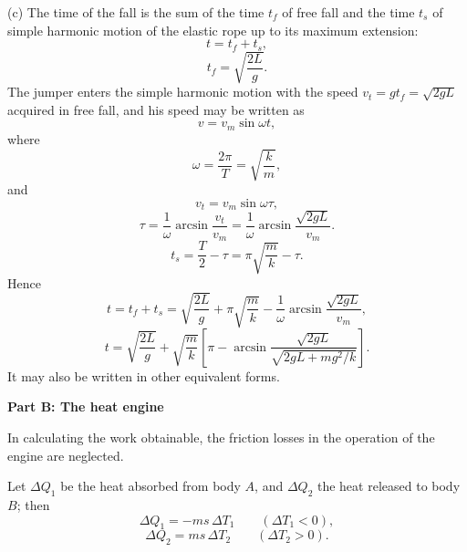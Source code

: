 (c) The time of the fall is the sum of the time $t_f$ of free fall and the time $t_s$ of simple harmonic motion of the elastic rope up to its maximum extension:
\begin{equation*}
t=t_f+t_s ,
\end{equation*}
\begin{equation*}
t_f=\sqrt{\frac{2L}{g}} .
\end{equation*}
The jumper enters the simple harmonic motion with the speed $v_t=gt_f=\sqrt{2gL}$ acquired in free fall, and his speed may be written as
\begin{equation*}
v=v_m\sin\omega t ,
\end{equation*}
where
\begin{equation*}
\omega=\frac{2\pi}{T}=\sqrt{\frac{k}{m}} ,
\end{equation*}
and
\begin{equation*}
v_t=v_m\sin\omega\tau ,
\end{equation*}
\begin{equation*}
\tau=\frac{1}{\omega}\arcsin\frac{v_t}{v_m}
=\frac{1}{\omega}\arcsin\frac{\sqrt{2gL}}{v_m} .
\end{equation*}
\begin{equation*}
t_s=\frac{T}{2}-\tau=\pi\sqrt{\frac{m}{k}}-\tau .
\end{equation*}
Hence
\begin{equation*}
t=t_f+t_s=\sqrt{\frac{2L}{g}}+\pi\sqrt{\frac{m}{k}}
-\frac{1}{\omega}\arcsin\frac{\sqrt{2gL}}{v_m} ,
\end{equation*}
\begin{equation*}
t=\sqrt{\frac{2L}{g}}+\sqrt{\frac{m}{k}}
\left[\pi-\arcsin\frac{\sqrt{2gL}}{\sqrt{2gL+mg^2/k}}\right] .
\end{equation*}
It may also be written in other equivalent forms.

\textbf{Part B: The heat engine}

In calculating the work obtainable, the friction losses in the operation of the engine are neglected.

Let $\Delta Q_1$ be the heat absorbed from body $A$, and $\Delta Q_2$ the heat released to body $B$; then
\begin{equation*}
\Delta Q_1=-ms\,\Delta T_1\qquad(\Delta T_1<0),
\end{equation*}
\begin{equation*}
\Delta Q_2=ms\,\Delta T_2\qquad(\Delta T_2>0).
\end{equation*}

